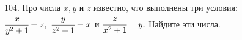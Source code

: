 104. Про числа $x, y$ и $z$ известно, что выполнены три условия: $\cfrac{x}{y^2+1}=z,\ \cfrac{y}{z^2+1}=x$ и $\cfrac{z}{x^2+1}=y.$ Найдите эти числа.\\
